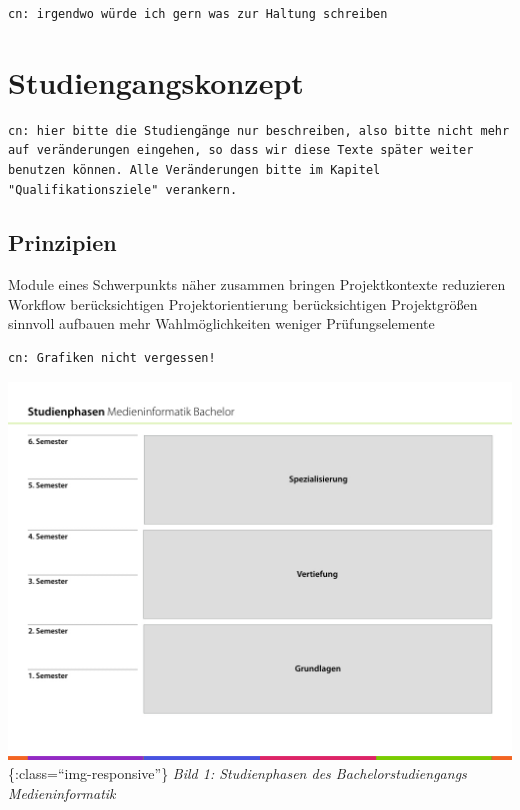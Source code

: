\begin{verbatim}
cn: irgendwo würde ich gern was zur Haltung schreiben
\end{verbatim}

\chapter{Studiengangskonzept}\label{studiengangskonzept}

\begin{verbatim}
cn: hier bitte die Studiengänge nur beschreiben, also bitte nicht mehr auf veränderungen eingehen, so dass wir diese Texte später weiter benutzen können. Alle Veränderungen bitte im Kapitel "Qualifikationsziele" verankern.
\end{verbatim}

\section{Prinzipien}\label{prinzipien}

Module eines Schwerpunkts näher zusammen bringen Projektkontexte
reduzieren Workflow berücksichtigen Projektorientierung berücksichtigen
Projektgrößen sinnvoll aufbauen mehr Wahlmöglichkeiten weniger
Prüfungselemente

\begin{verbatim}
cn: Grafiken nicht vergessen!
\end{verbatim}

\includegraphics{../anhaenge/bilder/ba-studienphasen.001.jpeg}\{:class=``img-responsive''\}
\emph{Bild 1: Studienphasen des Bachelorstudiengangs Medieninformatik}

